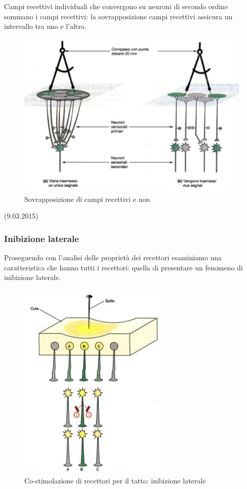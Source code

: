 \documentclass[a4paper,12pt]{article}
\begin{document}
Campi recettivi individuali che convergono su neuroni di secondo ordine sommano i campi recettivi: la sovrapposizione campi recettivi assicura un intervallo tra uno e l'altro. 

\begin{figure}[H]
\centering
\includegraphics[scale=0.4]{immagine/compasso.jpg}
\caption{Sovrapposizione di campi recettivi e non}
\end{figure}

(9.03.2015)
\subsubsection{Inibizione laterale}
Proseguendo con l'analisi delle proprietà dei recettori esaminiamo una caratteristica che hanno tutti i recettori: quella di presentare un fenomeno di inibizione laterale. 


\begin{figure}[H]
\centering
\includegraphics[scale=0.4]{immagine/inibizione.jpg}
\caption{Co-stimolazione di recettori per il tatto: inibizione laterale}
\end{figure}
\end{document}
